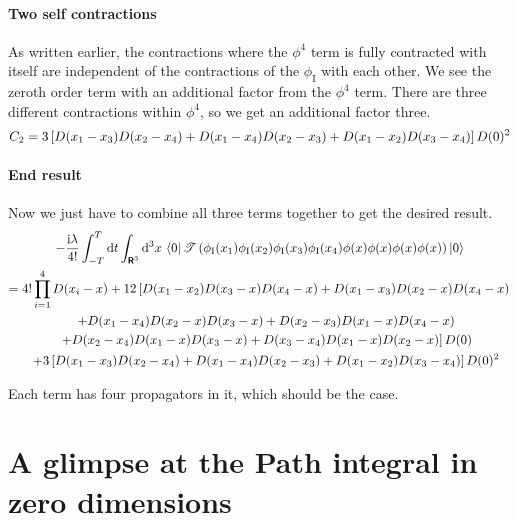 \documentclass[11pt, english, fleqn, DIV=15, headinclude, BCOR=1cm]{scrartcl}
\newcommand\timeorder{\mathscr T}
\begin{document}
\paragraph{Two self contractions}

As written earlier, the contractions where the $\phi^4$ term is fully
contracted with itself are independent of the contractions of the $\phi_\mathrm
I$ with each other. We see the zeroth order term with an additional factor from
the $\phi^4$ term. There are three different contractions within $\phi^4$, so
we get an additional factor three.
\[
    C_2
    = 3 \left[  D(x_1 - x_3) D(x_2 - x_4) + D(x_1 - x_4) D(x_2 - x_3)
    + D(x_1 - x_2) D(x_3 - x_4) \right] D(0)^2
\]

\paragraph{End result}

Now we just have to combine all three terms together to get the desired result.
\begin{multline*}
    - \frac{\iup \lambda}{4!}
    \int_{-T}^T \dif t
    \int_{\R^3} \dif^3 x \,
    \bra 0
    \timeorder\del{
        \phi_\mathrm I(x_1)
        \phi_\mathrm I(x_2)
        \phi_\mathrm I(x_3)
        \phi_\mathrm I(x_4)
        \phi(x) \phi(x) \phi(x) \phi(x)
    }
    \ket 0 \\
    = 4! \prod_{i = 1}^4 D(x_i - x)
    + 12 \left[
        D(x_1 - x_2) D(x_3 - x) D(x_4 - x)
        + D(x_1 - x_3) D(x_2 - x) D(x_4 - x)
        \right. \\ \quad
        + D(x_1 - x_4) D(x_2 - x) D(x_3 - x)
        + D(x_2 - x_3) D(x_1 - x) D(x_4 - x)
        \\ \quad \left.
        + D(x_2 - x_4) D(x_1 - x) D(x_3 - x)
        + D(x_3 - x_4) D(x_1 - x) D(x_2 - x)
    \right] D(0) \\
    \quad + 3 \sbr{ D(x_1 - x_3) D(x_2 - x_4) + D(x_1 - x_4) D(x_2 - x_3)
    + D(x_1 - x_2) D(x_3 - x_4)} D(0)^2
\end{multline*}

Each term has four propagators in it, which should be the case.

\section{A glimpse at the Path integral in zero dimensions}
\label{homework:2}
\end{document}
